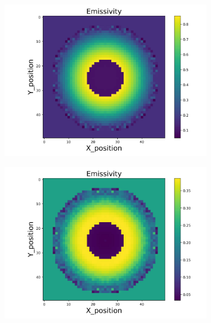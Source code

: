 \begin{figure}[p]
\begin{minipage}{\textwidth}
        \begin{subfigure}{0.325\textwidth}
            \centering
            \includegraphics[width=\textwidth]{figures/raw_data/23/mix/emi_cal.jpg}
        \end{subfigure}
        \begin{subfigure}{0.325\textwidth}
            \centering
            \includegraphics[width=\textwidth]{figures/raw_data/24/mix/emi_cal.jpg}
        \end{subfigure}
    \end{minipage}\\
    \begin{minipage}{\textwidth}

\end{minipage}
\end{figure}
